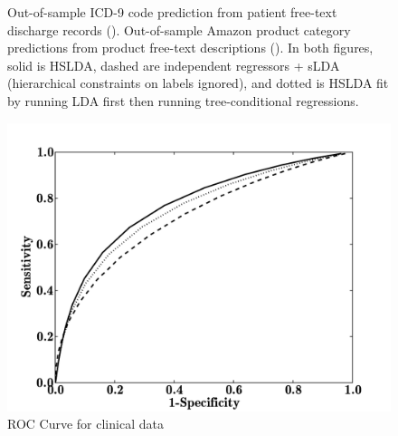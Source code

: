 \begin{figure}%
\begin{center}
\caption{Out-of-sample ICD-9 code prediction from patient free-text discharge records 
(). Out-of-sample Amazon product category predictions from 
product free-text descriptions (). In both figures, solid is 
HSLDA, dashed are independent regressors + sLDA (hierarchical 
constraints on labels ignored), and dotted is HSLDA fit by running LDA first then running 
tree-conditional regressions.}
\label{fig:main_results}
\end{center}
\end{figure}

\begin{figure}[t]
 \centering \includegraphics[scale=0.4]{figs/ROC_comparison_leafs} \caption{ROC Curve for clinical data}
\label{fig:clinical_roc} 
\end{figure}
